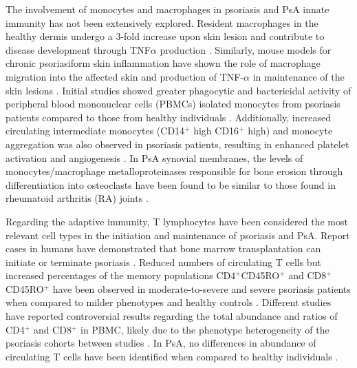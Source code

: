 The involvement of monocytes and macrophages in psoriasis and PsA innate immunity has not been extensively explored. Resident macrophages in the healthy dermis undergo a 3-fold increase upon skin lesion and contribute to disease development through TNF$\alpha$ production \parencite{Perera2012, Mahil2016}. Similarly, mouse models for chronic psoriasiform skin inflammation have shown the role of macrophage migration into the affected skin and production of TNF-$\alpha$ in maintenance of the skin lesions \parencite{Stratis2006, Wang2006}. Initial studies showed greater phagocytic and bactericidal activity of peripheral blood mononuclear cells (PBMCs) isolated monocytes from psoriasis patients compared to those from healthy individuals \parencite{Bar-Eli1979}. Additionally, increased circulating intermediate monocytes (CD14$^+$ high CD16$^+$ high) and monocyte aggregation was also observed in psoriasis patients, resulting in enhanced platelet activation and angiogenesis \parencite {Golden2015}. In PsA synovial membranes, the levels of monocytes/macrophage metalloproteinases responsible for bone erosion through differentiation into osteoclasts  have been found to be similar to those found in rheumatoid arthritis (RA) joints \parencite{Hitchon2002}. 

Regarding the adaptive immunity, T lymphocytes have been considered the most relevant cell types in the initiation and maintenance of psoriasis and PsA. Report cases in humans have demonstrated that bone marrow transplantation can initiate or terminate psoriasis \parencite{Eedy1990, Gardembas1990}. Reduced numbers of circulating T cells but increased percentages of the memory populations CD4$^+$CD45RO$^+$ and CD8$^+$CD45RO$^+$ have been observed in moderate-to-severe and severe psoriasis patients when compared to milder phenotypes and healthy controls \parencite{Lecewicz-Toruń2001,Langewouters2008}. Different studies have reported controversial results regarding the total abundance and ratios of CD4$^+$ and CD8$^{+}$ in PBMC, likely due to the phenotype heterogeneity of the psoriasis cohorts between studies \parencite{Lecewicz-Toruń2001,Cameron2003,Langewouters2008}. In PsA, no differences in abundance of circulating T cells have been identified when compared to healthy individuals \parencite{Costello1999}.

